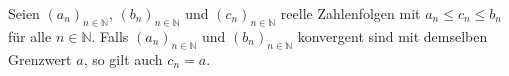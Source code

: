 Seien $(a_n)_{n \in \mathbb{N}}$, $(b_n)_{n \in \mathbb{N}}$ und $(c_n)_{n \in \mathbb{N}}$ reelle Zahlenfolgen mit $a_n \leq c_n \leq b_n$ für alle $n \in \mathbb{N}$. Falls $(a_n)_{n \in \mathbb{N}}$ und $(b_n)_{n \in \mathbb{N}}$ konvergent sind mit demselben Grenzwert $a$, so gilt auch $c_n = a$.